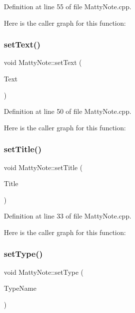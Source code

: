 Definition at line 55 of file Matty\+Note.\+cpp.

Here is the caller graph for this function\+:
\hypertarget{classMattyNote_afa0c4ee32401e4a09e8d04fd0b01da0b}{}\label{classMattyNote_afa0c4ee32401e4a09e8d04fd0b01da0b} 
\subsubsection{\texorpdfstring{set\+Text()}{setText()}}
{\footnotesize\ttfamily void Matty\+Note\+::set\+Text (\begin{DoxyParamCaption}\item[{const Q\+String \&}]{Text }\end{DoxyParamCaption})}



Definition at line 50 of file Matty\+Note.\+cpp.

Here is the caller graph for this function\+:
\hypertarget{classMattyNote_af7909f64608b020b501019cf29796eb0}{}\label{classMattyNote_af7909f64608b020b501019cf29796eb0} 
\subsubsection{\texorpdfstring{set\+Title()}{setTitle()}}
{\footnotesize\ttfamily void Matty\+Note\+::set\+Title (\begin{DoxyParamCaption}\item[{const Q\+String \&}]{Title }\end{DoxyParamCaption})}



Definition at line 33 of file Matty\+Note.\+cpp.

Here is the caller graph for this function\+:
\hypertarget{classMattyNote_ac9171fd4faaf0c286c9315a0b4ef4560}{}\label{classMattyNote_ac9171fd4faaf0c286c9315a0b4ef4560} 
\subsubsection{\texorpdfstring{set\+Type()}{setType()}\hspace{0.1cm}{\footnotesize\ttfamily [1/2]}}
{\footnotesize\ttfamily void Matty\+Note\+::set\+Type (\begin{DoxyParamCaption}\item[{const Q\+String \&}]{Type\+Name }\end{DoxyParamCaption})}




